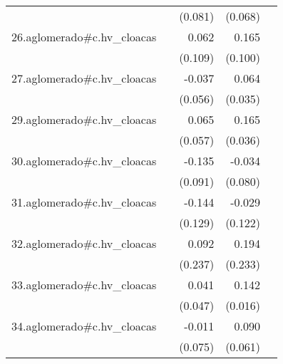{\begin{longtable}{l*{4}{D{.}{.}{-1}}}
            &                     &     (0.081)         &     (0.068)         &                     \\
\addlinespace
26.aglomerado#c.hv\_cloacas&                     &       0.062         &       0.165         &                     \\
            &                     &     (0.109)         &     (0.100)         &                     \\
\addlinespace
27.aglomerado#c.hv\_cloacas&                     &      -0.037         &       0.064         &                     \\
            &                     &     (0.056)         &     (0.035)         &                     \\
\addlinespace
29.aglomerado#c.hv\_cloacas&                     &       0.065         &       0.165\sym{***}&                     \\
            &                     &     (0.057)         &     (0.036)         &                     \\
\addlinespace
30.aglomerado#c.hv\_cloacas&                     &      -0.135         &      -0.034         &                     \\
            &                     &     (0.091)         &     (0.080)         &                     \\
\addlinespace
31.aglomerado#c.hv\_cloacas&                     &      -0.144         &      -0.029         &                     \\
            &                     &     (0.129)         &     (0.122)         &                     \\
\addlinespace
32.aglomerado#c.hv\_cloacas&                     &       0.092         &       0.194         &                     \\
            &                     &     (0.237)         &     (0.233)         &                     \\
\addlinespace
33.aglomerado#c.hv\_cloacas&                     &       0.041         &       0.142\sym{***}&                     \\
            &                     &     (0.047)         &     (0.016)         &                     \\
\addlinespace
34.aglomerado#c.hv\_cloacas&                     &      -0.011         &       0.090         &                     \\
            &                     &     (0.075)         &     (0.061)         &                     \\

\end{longtable}}
